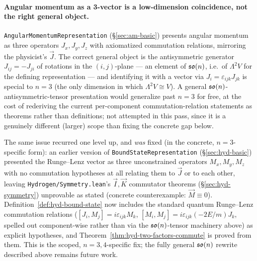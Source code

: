 \paragraph{Angular momentum as a 3-vector is a low-dimension coincidence,
not the right general object.} \texttt{AngularMomentumRepresentation}
(\S\ref{sec:am-basic}) presents angular momentum as three operators
$J_x,J_y,J_z$ with axiomatized commutation relations, mirroring the
physicist's $\vec J$. The correct general object is the antisymmetric
generator $J_{ij}=-J_{ji}$ of rotations in the $(i,j)$-plane --- an element
of $\mathfrak{so}(n)$, i.e.\ of $\Lambda^2 V$ for the defining representation
--- and identifying it with a vector via $J_i = \varepsilon_{ijk}J_{jk}$ is
special to $n=3$ (the only dimension in which $\Lambda^2 V\cong V$). A
general $\mathfrak{so}(n)$-antisymmetric-tensor presentation would generalize
past $n=3$ for free, at the cost of rederiving the current per-component
commutation-relation statements as theorems rather than definitions; not
attempted in this pass, since it is a genuinely different (larger) scope
than fixing the concrete gap below.

The same issue recurred one level up, and \emph{was} fixed (in the concrete,
$n=3$-specific form): an earlier version of \texttt{BoundStateRepresentation}
(\S\ref{sec:hyd-basic}) presented the Runge--Lenz vector as three
unconstrained operators $M_x,M_y,M_z$ with no commutation hypotheses at all
relating them to $\vec J$ or to each other, leaving
\texttt{Hydrogen/Symmetry.lean}'s $\vec I,\vec K$ commutator theorems
(\S\ref{sec:hyd-symmetry}) unprovable as stated (concrete counterexample:
$\vec M \equiv 0$). Definition~\ref{def:hyd-bound-state} now includes the
standard quantum Runge--Lenz commutation relations
($[J_i,M_j]=i\varepsilon_{ijk}M_k$, $[M_i,M_j]=i\varepsilon_{ijk}(-2E/m)J_k$,
spelled out component-wise rather than via the $\mathfrak{so}(n)$-tensor
machinery above) as explicit hypotheses, and
Theorem~\ref{thm:hyd-two-factors-commute} is proved from them. This is the
scoped, $n=3,4$-specific fix; the fully general $\mathfrak{so}(n)$ rewrite
described above remains future work.
